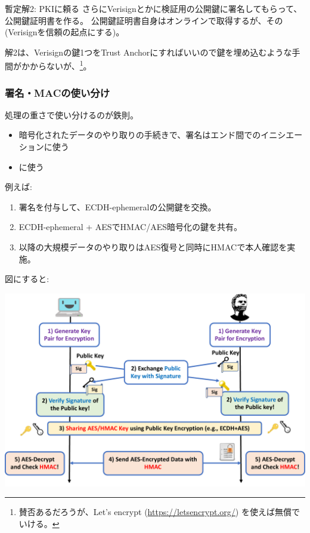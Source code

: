 \documentclass[12pt,dvipdfmx]{beamer}
\begin{document}
\begin{frame}
 
\begin{block}{暫定解2: PKIに頼る}
さらに\alert{Verisignとかに検証用の公開鍵に署名してもらって、公開鍵証明書を作る}。
公開鍵証明書自身はオンラインで取得するが、その(Verisignを信頼の起点にする)。
\end{block}

解2は、Verisignの鍵1つをTrust Anchorにすればいいので鍵を埋め込むような手間がかからないが、\footnote[frame]{\scriptsize 賛否あるだろうが、Let's encrypt (\url{https://letsencrypt.org/}) を使えば無償でいける。}。


\end{frame}

\begin{frame}
\frametitle{署名・MACの使い分け}
処理の重さで使い分けるのが鉄則。

\begin{itemize}
 \item 暗号化されたデータのやり取りの手続きで、\alert{署名はエンド間でのイニシエーション}に使う
 \item {}に使う
\end{itemize}

\vspace{2ex}

例えば:
\begin{enumerate}
\item 署名を付与して、ECDH-ephemeralの公開鍵を交換。
\item ECDH-ephemeral + AESでHMAC/AES暗号化の鍵を共有。
\item 以降の大規模データのやり取りはAES復号と同時にHMACで本人確認を実施。
\end{enumerate}

\end{frame}
\begin{frame}
図にすると:
\begin{center}
\includegraphics[width=\linewidth]{Figs/key-exchange-flow01.pdf}
\end{center}
\end{frame}
\end{document}

